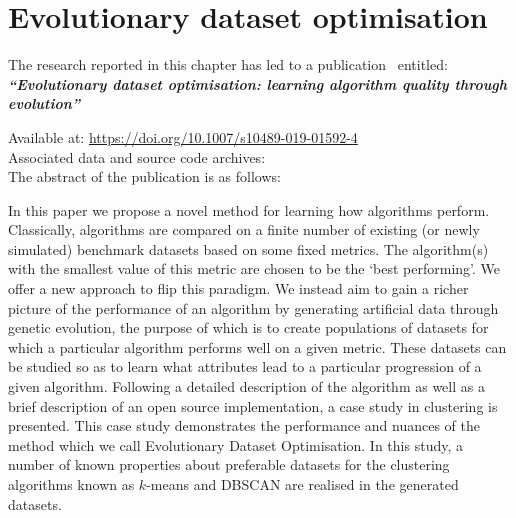 \chapter{Evolutionary dataset optimisation}

\graphicspath{{chapters/edo/paper/img/}}
\renewcommand{\tikzpath}{chapters/edo/paper/tex/diagrams}
\renewcommand{\algpath}{chapters/edo/paper/tex/algorithms}

\begin{minipage}{\textwidth}
    \begin{center}
        The research reported in this chapter has led to a
        publication~\cite{Wilde2020:edo} entitled:\\[1em]

        {%
            \bf\itshape{``Evolutionary dataset optimisation: learning algorithm
            quality through evolution''}
        }

        Available at:
        \url{https://doi.org/10.1007/s10489-019-01592-4}\\

        Associated data and source code
        archives:~\cite{Wilde2019:edo:data,Wilde2019:edo:code}\\[1em]

        The abstract of the publication is as follows:\\[1em]
    \end{center}

    In this paper we propose a novel method for learning how algorithms perform.
    Classically, algorithms are compared on a finite number of existing (or
    newly simulated) benchmark datasets based on some fixed metrics. The
    algorithm(s) with the smallest value of this metric are chosen to be the
    `best performing'. We offer a new approach to flip this paradigm. We
    instead aim to gain a richer picture of the performance of an algorithm by
    generating artificial data through genetic evolution, the purpose of which
    is to create populations of datasets for which a particular algorithm
    performs well on a given metric. These datasets can be studied so as to
    learn what attributes lead to a particular progression of a given algorithm.
    Following a detailed description of the algorithm as well as a brief
    description of an open source implementation, a case study in clustering is
    presented. This case study demonstrates the performance and nuances of the
    method which we call Evolutionary Dataset Optimisation. In this study, a
    number of known properties about preferable datasets for the clustering
    algorithms known as \(k\)-means and DBSCAN are realised in the generated
    datasets.
\end{minipage}

